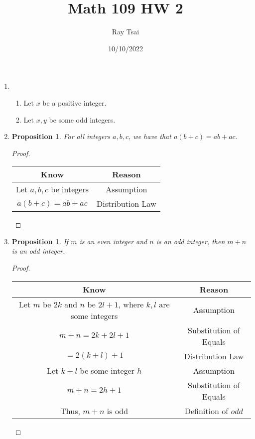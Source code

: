 \documentclass{article}
\title{Math 109 HW 2}
\author{Ray Tsai}
\date{10/10/2022}
\newtheorem{prop}[thm]{Proposition}
\begin{document}
 

\maketitle 

\begin{enumerate}
\item 
\begin{enumerate}
    \item
    Let $x$ be a positive integer.
    \item
    Let $x, y$ be some odd integers.
\end{enumerate}

\item \begin{prop}
    For all integers $a, b, c$, we have that $a(b+c) = ab+ac$.
    \end{prop}
    \begin{proof} \
    \begin{center}
    \begin{tabular}{|c|c|}
    \hline
    Know & Reason \\ \hline
    Let $a, b, c$ be integers & Assumption \\ \hline
    $a(b + c) = ab + ac$ & Distribution Law \\ \hline
\end{tabular}
\end{center}
\end{proof}

\item \begin{prop}
    If $m$ is an even integer and $n$ is an odd integer, then $m + n$ is an odd integer.
    \end{prop}
    \begin{proof} \
    \begin{center}
    \begin{tabular}{|c|c|}
    \hline
    Know & Reason \\ \hline
    Let $m$ be $2k$ and $n$ be $2l + 1$, where $k, l$ are some integers & Assumption \\ \hline
    $m + n = 2k + 2l + 1$ & Substitution of Equals \\ \hline
    $= 2(k + l) + 1$ & Distribution Law \\ \hline
    Let $k + l$ be some integer $h$ & Assumption \\ \hline
    $m + n = 2h + 1$ & Substitution of Equals \\ \hline
    Thus, $m + n$ is odd & Definition of $odd$ \\ \hline 
\end{tabular}
\end{center}
\end{proof} 


\end{enumerate}
\end{document}
